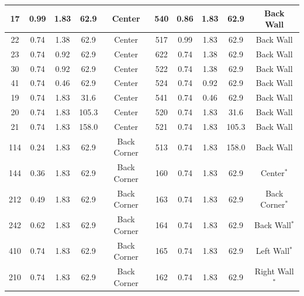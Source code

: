 \begin{table}[h!]
\begin{center}
\begin{tabular}{|c|c|c|c|c||c|c|c|c|c|}
17      & 0.99      & 1.83          &  62.9      & Center       & 540   & 0.86      & 1.83        &  62.9         & Back Wall           \\ \hline
22      & 0.74      & 1.38          &  62.9      & Center       & 517   & 0.99      & 1.83        &  62.9         & Back Wall           \\ \hline
23      & 0.74      & 0.92          &  62.9      & Center       & 622   & 0.74      & 1.38        &  62.9         & Back Wall           \\ \hline
30      & 0.74      & 0.92          &  62.9      & Center       & 522   & 0.74      & 1.38        &  62.9         & Back Wall           \\ \hline
41      & 0.74      & 0.46          &  62.9      & Center       & 524   & 0.74      & 0.92        &  62.9         & Back Wall           \\ \hline
19      & 0.74      & 1.83          &  31.6      & Center       & 541   & 0.74      & 0.46        &  62.9         & Back Wall           \\ \hline
20      & 0.74      & 1.83          &  105.3     & Center       & 520   & 0.74      & 1.83        &  31.6         & Back Wall           \\ \hline
21      & 0.74      & 1.83          &  158.0     & Center       & 521   & 0.74      & 1.83        &  105.3        & Back Wall           \\ \hline
114     & 0.24      & 1.83          &  62.9      & Back Corner  & 513   & 0.74      & 1.83        &  158.0        & Back Wall           \\ \hline
144     & 0.36      & 1.83          &  62.9      & Back Corner  & 160   & 0.74      & 1.83        &  62.9         & Center$^*$          \\ \hline
212     & 0.49      & 1.83          &  62.9      & Back Corner  & 163   & 0.74      & 1.83        &  62.9         & Back Corner$^*$     \\ \hline
242     & 0.62      & 1.83          &  62.9      & Back Corner  & 164   & 0.74      & 1.83        &  62.9         & Back Wall$^*$       \\ \hline
410     & 0.74      & 1.83          &  62.9      & Back Corner  & 165   & 0.74      & 1.83        &  62.9         & Left Wall$^*$       \\ \hline
210     & 0.74      & 1.83          &  62.9      & Back Corner  & 162   & 0.74      & 1.83        &  62.9         & Right Wall$^*$      \\ \hline

\end{tabular}
\end{center}
\end{table}
